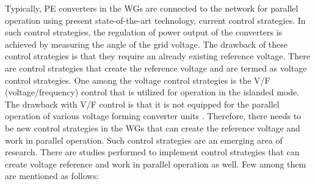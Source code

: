 Typically, \gls{PE} converters in the \gls{WG}s are connected to the network for parallel operation using present state-of-the-art technology, current control strategies. In such control strategies, the regulation of power output of the converters is achieved by measuring the angle of the grid voltage. The drawback of these control strategies is that they require an already existing reference voltage. There are control strategies that create the reference voltage and are termed as voltage control strategies. One among the voltage control strategies is the V/F (voltage/frequency) control that is utilized for operation in the islanded mode. The drawback with V/F control is that it is not equipped for the parallel operation of various voltage forming converter units \cite{weise2019comparison}. Therefore, there needs to be new control strategies in the \gls{WG}s that can create the reference voltage and work in parallel operation. Such control strategies are an emerging area of research. There are studies performed to implement control strategies that can create voltage reference and work in parallel operation as well. Few among them are mentioned as follows:


